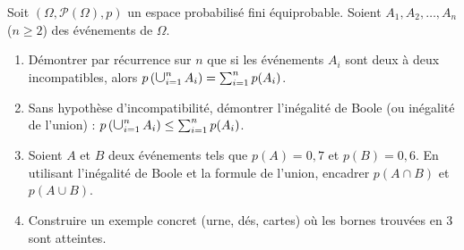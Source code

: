 \documentclass[11pt]{article}
\def\bigcup{\mathop{\mathchoice{\raisebox{-0.3em}{\scalebox{1.7}{$\cup$}}}{\scalebox{1.25}{$\cup$}}{\cup}{\cup}}\displaylimits}%
\begin{document}
\begin{exercice}
Soit $(\Omega, \mathcal{P}(\Omega), p)$ un espace probabilisé fini équiprobable. Soient $A_1, A_2, \dots, A_n$ ($n \ge 2$) des événements de $\Omega$.
\begin{enumerate}
    \item Démontrer par récurrence sur $n$ que si les événements $A_i$ sont deux à deux incompatibles, alors $p\left(\bigcup_{i=1}^n A_i\right) = \sum_{i=1}^n p(A_i)$.
    \item Sans hypothèse d'incompatibilité, démontrer l'inégalité de Boole (ou inégalité de l'union) : $p\left(\bigcup_{i=1}^n A_i\right) \le \sum_{i=1}^n p(A_i)$.
    \item Soient $A$ et $B$ deux événements tels que $p(A) = 0,7$ et $p(B) = 0,6$. En utilisant l'inégalité de Boole et la formule de l'union, encadrer $p(A \cap B)$ et $p(A \cup B)$.
    \item Construire un exemple concret (urne, dés, cartes) où les bornes trouvées en 3 sont atteintes.
\end{enumerate}
\end{exercice}
\end{document}
